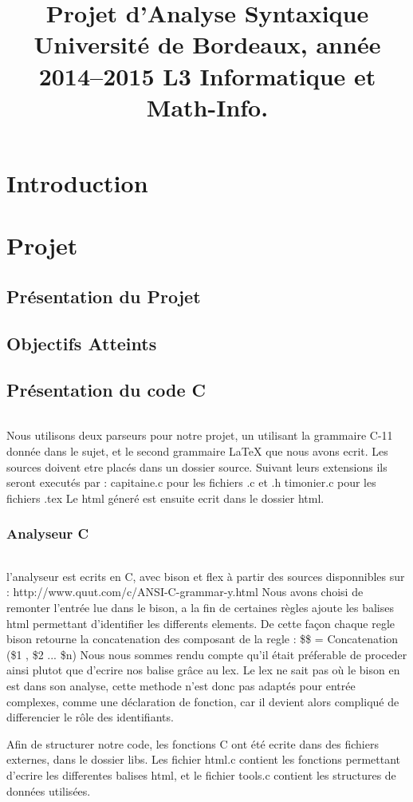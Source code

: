 \documentclass{report}
\title{Projet d’Analyse Syntaxique Université de Bordeaux, année 2014–2015 L3 Informatique et Math-Info.}
\begin{document}
\maketitle
\tableofcontents
\part{Introduction}
\part{Projet}
\chapter{Présentation du Projet}
\chapter{Objectifs Atteints}
\chapter{Présentation du code C}
\paragraph{}{Nous utilisons deux parseurs pour notre projet, un utilisant la grammaire C-11 donnée dans le sujet, et le second grammaire LaTeX que nous avons ecrit.
	Les sources doivent etre placés dans un dossier source. Suivant leurs extensions ils seront executés par :
	capitaine.c pour les fichiers .c et .h
	timonier.c pour les fichiers .tex
	Le html géneré est ensuite ecrit dans le dossier html.
}
\section{Analyseur C}{
\paragraph{}{
	l'analyseur est ecrits en C, avec bison et flex à partir des sources disponnibles sur : http://www.quut.com/c/ANSI-C-grammar-y.html
	Nous avons choisi de remonter l'entrée lue dans le bison, a la fin de certaines règles ajoute les balises html permettant d'identifier les differents elements.
	De cette façon chaque regle bison retourne la concatenation des composant de la regle : \$\$ = Concatenation (\$1 , \$2 ... \$n)
	Nous nous sommes rendu compte qu'il était préferable de proceder ainsi plutot que d'ecrire nos balise grâce au lex. Le lex ne sait pas où le bison en est dans son analyse,
	cette methode n'est donc pas adaptés pour entrée complexes, comme une déclaration de fonction, car il devient alors compliqué de differencier le rôle des identifiants.
	
	Afin de structurer notre code, les fonctions C ont été ecrite dans des fichiers externes, dans le dossier libs. Les fichier html.c contient les fonctions permettant d'ecrire les
	differentes balises html, et le fichier tools.c contient les structures de données utilisées.
	}
	}
\end{document}
